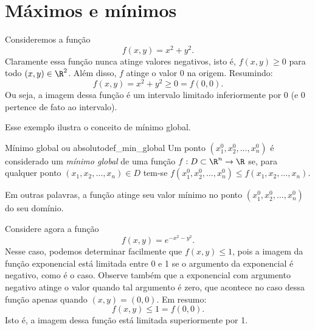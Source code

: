 \chapter{Máximos e mínimos}



Consideremos a função 
\begin{equation}\label{eq:minimo_global}
f(x,y)=x^2+y^2.
\end{equation}
Claramente essa função nunca atinge valores negativos, isto é, $f(x,y)\geq 0$ para todo $(x,y)\in \R^2$. Além disso, $f$ atinge o valor 0 na origem. Resumindo:
$$f(x,y)=x^2+y^2\geq 0 = f(0,0).$$
Ou seja, a imagem dessa função é um intervalo limitado inferiormente por 0 (e 0 pertence de fato ao intervalo). 

Esse exemplo ilustra o conceito de mínimo global. 
\begin{definition}{Mínimo global ou absoluto}{def_min_global}
Um ponto \((x_1^0, x_2^0, \ldots, x_n^0)\) é considerado um \textit{mínimo global} de uma função \(f:D\subset\R^n\to\R\) se, para qualquer ponto \((x_1, x_2, \ldots, x_n)\in D\) tem-se \(f(x_1^0, x_2^0, \ldots, x_n^0) \leq f(x_1, x_2, \ldots, x_n)\). 
\end{definition}
Em outras palavras, a função atinge seu valor mínimo no ponto \((x_1^0, x_2^0, \ldots, x_n^0)\) do seu domínio. 

Considere agora a função 
\begin{equation}\label{eq:maximo_global}
{f}(x,y)=e^{-x^2-y^2}.
\end{equation}
Nesse caso, podemos determinar facilmente que $f(x,y)\leq 1 $, pois a imagem da função exponencial está limitada entre 0 e 1 se o argumento da exponencial é negativo, como é o caso. Observe também que a exponencial com argumento negativo atinge o valor quando tal argumento é zero, que acontece no caso dessa função apenas quando $(x,y)=(0,0)$.
Em resumo:
$${f}(x,y)\leq 1 = f(0,0). $$
Isto é, a imagem dessa função está limitada superiormente por 1. 

